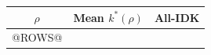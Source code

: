 \begin{tabular}{ccc}
\toprule
$\rho$ & Mean $k^*(\rho)$ & All-IDK\\
\midrule
@ROWS@
\bottomrule
\end{tabular}
